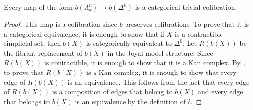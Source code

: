 \documentclass[reqno]{amsart}
\theoremstyle{definition}
\theoremstyle{remark}
\numberwithin{figure}{section}
\begin{document}
\begin{lem}[b-cof]
Every map of the form $b(\Lambda^n_k) \to b(\Delta^n)$ is a categorical trivial cofibration.
\end{lem}
\begin{proof}
This map is a cofibration since $b$ preserves cofibrations.
To prove that it is a categorical equivalence, it is enough to show that if $X$ is a contractible simplicial set, then $b(X)$ is categorically equivalent to $\Delta^0$.
Let $R(b(X))$ be the fibrant replacement of $b(X)$ in the Joyal model structure.
Since $R(b(X))$ is contractible, it is enough to show that it is a Kan complex.
By \cite[Proposition~1.2.5.1]{lurie-topos}, to prove that $R(b(X))$ is a Kan complex, it is enough to show that every edge of $R(b(X))$ is an equivalence.
This follows from the fact that every edge of $R(b(X))$ is a composition of edges that belong to $b(X)$ and every edge that belongs to $b(X)$ is an equivalence by the definition of $b$.
\end{proof}
\end{document}
